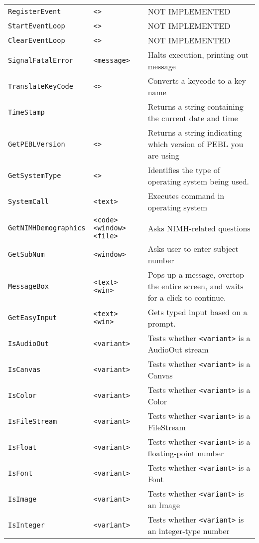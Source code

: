 \begin{longtable}{p{3cm}p{3cm}p{6cm}}
\verb+RegisterEvent+ &\verb+<>+ & NOT IMPLEMENTED\\ 
\verb+StartEventLoop+ &\verb+<>+ & NOT IMPLEMENTED\\ 
\verb+ClearEventLoop+ &\verb+<>+ & NOT IMPLEMENTED\\ 
\verb+SignalFatalError+ &\verb+<message>+ & Halts execution, printing out message \\ 
\verb+TranslateKeyCode+ &\verb+<>+ &Converts a keycode to a key name\\ 
\verb+TimeStamp+ & &Returns a string containing the current date and time\\ 
\verb+GetPEBLVersion+ &\verb+<>+ &Returns a string indicating which version of PEBL you are using\\ 
\verb+GetSystemType+ &\verb+<>+ &Identifies the type of operating system being used.\\ 
\verb+SystemCall+ &\verb+<text>+ &Executes command in operating system\\ 
\verb+GetNIMHDemographics+ & \hspace{0.7cm}\verb+<code>+ \verb+<window>+ \verb+<file>+ & Asks NIMH-related questions\\ 
\verb+GetSubNum+ & \verb+<window>+ & Asks user to enter subject number\\
\verb+MessageBox+ &\verb+<text>+ \verb+<win>+&Pops up a message, overtop the entire screen, and waits for a click to continue.\\
\verb+GetEasyInput+&\verb+<text>+ \verb+<win>+&Gets typed input based on a prompt.\\
\verb+IsAudioOut+ & \verb+<variant>+ & Tests whether \verb+<variant>+ is a AudioOut stream\\ 
\verb+IsCanvas+ & \verb+<variant>+ & Tests whether \verb+<variant>+ is a Canvas\\ 
\verb+IsColor+ & \verb+<variant>+ & Tests whether \verb+<variant>+ is a Color\\ 
\verb+IsFileStream+ & \verb+<variant>+ & Tests whether \verb+<variant>+ is a FileStream\\ 
\verb+IsFloat+ & \verb+<variant>+ & Tests whether \verb+<variant>+ is a floating-point number\\ 
\verb+IsFont+ & \verb+<variant>+ & Tests whether \verb+<variant>+ is a Font\\ 
\verb+IsImage+ & \verb+<variant>+ & Tests whether \verb+<variant>+ is an Image\\ 
\verb+IsInteger+ & \verb+<variant>+ & Tests whether \verb+<variant>+ is an integer-type number\\ 

\end{longtable}
